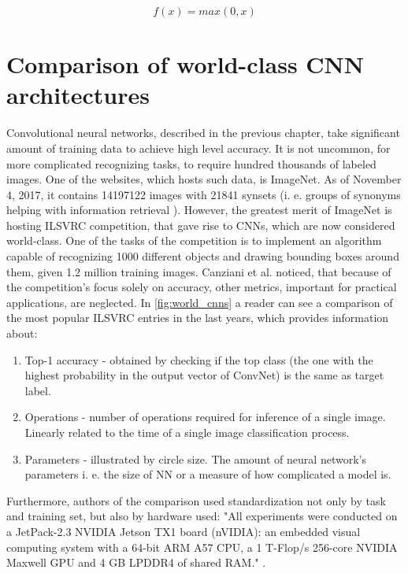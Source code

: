 \documentclass[11pt, a4paper]{article}
\begin{document}
\begin{equation} \label{eq:relu}
f(x) = max(0, x)
\end{equation}
\clearpage

\section{Comparison of world-class CNN architectures} \label{comparison_ccn_archs}
Convolutional neural networks, described in the previous chapter, take significant amount of training data to achieve high level accuracy. It is not uncommon, for more complicated recognizing tasks, to require hundred thousands of labeled images. One of the websites, which hosts such data, is ImageNet. As of November 4, 2017, it contains 14197122 images with 21841 synsets (i. e. groups of synonyms helping with information retrieval \cite{synset_def}). However, the greatest merit of ImageNet is hosting ILSVRC competition, that gave rise to CNNs, which are now considered world-class. One of the tasks of the competition is to implement an algorithm capable of recognizing 1000 different objects and drawing bounding boxes around them, given 1.2 million training images. Canziani et al. \cite{canziani_analysis} noticed, that because of the competition's focus solely on accuracy, other metrics, important for practical applications, are neglected. In \autoref{fig:world_cnns} a reader can see a comparison of the most popular ILSVRC entries in the last years, which provides information about:
\begin{enumerate}[1)]
\item Top-1 accuracy - obtained by checking if the top class (the one with the highest probability in the output vector of ConvNet) is the same as target label.
\item Operations - number of operations required for inference of a single image. Linearly related to the time of a single image classification process.
\item Parameters - illustrated by circle size. The amount of neural network’s parameters i. e. the size of NN or a measure of how complicated a model is.
\end{enumerate}
Furthermore, authors of the comparison used standardization not only by task and training set, but also by hardware used: "All experiments were conducted on a JetPack-2.3 NVIDIA Jetson TX1 board (nVIDIA): an embedded visual computing system with a 64-bit ARM A57 CPU, a 1 T-Flop/s 256-core NVIDIA Maxwell GPU and 4 GB LPDDR4 of shared RAM." \cite{canziani_analysis}.
\end{document}
